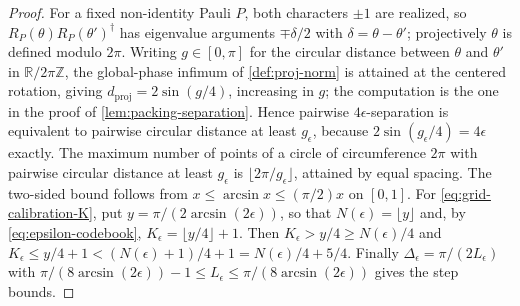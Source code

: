 \documentclass[a4paper,twocolumn,10pt,unpublished]{quantumarticle}
\begin{document}
\begin{proof}
For a fixed non-identity Pauli $P$, both characters $\pm1$ are realized,
so $R_P(\theta)R_P(\theta')^\dagger$ has eigenvalue arguments
$\mp\delta/2$ with $\delta=\theta-\theta'$; projectively $\theta$ is
defined modulo $2\pi$.  Writing $g\in[0,\pi]$ for the circular distance
between $\theta$ and $\theta'$ in $\mathbb R/2\pi\mathbb Z$, the
global-phase infimum of \cref{def:proj-norm} is attained at the centered
rotation, giving $d_{\mathrm{proj}}=2\sin(g/4)$, increasing in $g$; the
computation is the one in the proof of \cref{lem:packing-separation}.
Hence pairwise $4\epsilon$-separation is equivalent to pairwise circular
distance at least $g_\epsilon$, because $2\sin(g_\epsilon/4)=4\epsilon$
exactly.  The maximum number of points of a circle of circumference
$2\pi$ with pairwise circular distance at least $g_\epsilon$ is
$\lfloor2\pi/g_\epsilon\rfloor$, attained by equal spacing.  The
two-sided bound follows from $x\leq\arcsin x\leq(\pi/2)x$ on $[0,1]$.
For \eqref{eq:grid-calibration-K}, put $y=\pi/(2\arcsin(2\epsilon))$, so
that $N(\epsilon)=\lfloor y\rfloor$ and, by
\eqref{eq:epsilon-codebook}, $K_\epsilon=\lfloor y/4\rfloor+1$.  Then
$K_\epsilon>y/4\geq N(\epsilon)/4$ and
$K_\epsilon\leq y/4+1<(N(\epsilon)+1)/4+1=N(\epsilon)/4+5/4$.  Finally
$\Delta_\epsilon=\pi/(2L_\epsilon)$ with
$\pi/(8\arcsin(2\epsilon))-1\leq L_\epsilon
\leq\pi/(8\arcsin(2\epsilon))$ gives the step bounds.
\end{proof}
\end{document}
